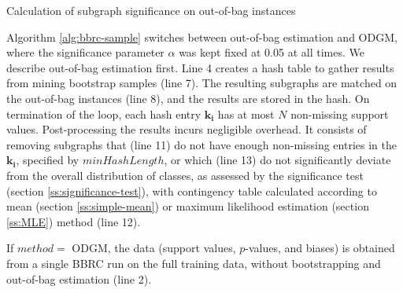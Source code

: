 \documentclass{sig-alternate}
\begin{document}
\begin{algorithm2e*}[t]
  \fontsize{8}{10}
  \selectfont
  \caption{Calculation of subgraph significance on out-of-bag instances\label{alg:bbrc-sample}}
\end{algorithm2e*}
Algorithm \ref{alg:bbrc-sample} switches between out-of-bag estimation and ODGM, where 
the significance parameter $\alpha$ was kept fixed at 0.05 at all times.
We describe out-of-bag estimation first. Line 4
creates a hash table to gather results from mining bootstrap samples 
(line 7). The resulting subgraphs are matched on the out-of-bag instances (line
8), and the results are stored in the hash. On termination of the loop, each hash
entry $\mathbf{k_i}$ has at most $N$ non-missing support values. Post-processing the results
incurs negligible overhead. It
consists of removing subgraphs that (line 11) do not have enough non-missing entries in the 
$\mathbf{k_i}$,
specified by $minHashLength$, or which (line 13) do not significantly
deviate from the overall distribution of classes, as assessed by the significance
test (section \ref{ss:significance-test}), with contingency table calculated
according to mean (section \ref{ss:simple-mean}) or maximum likelihood
estimation (section \ref{ss:MLE}) method (line 12). 

If $method=$ ODGM, the data (support values, $p$-values, and biases) is obtained from a single BBRC run on the full training data, without bootstrapping and out-of-bag estimation (line 2).
\end{document}
